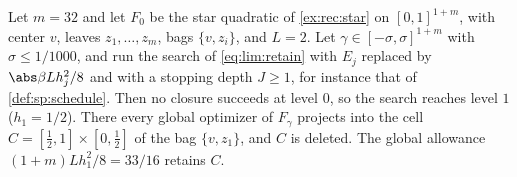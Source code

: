 \begin{proposition}\label{prop:lim:local}
Let $m=32$ and let $F_0$ be the star quadratic of \cref{ex:rec:star} on
$[0,1]^{1+m}$, with center $v$, leaves $z_1,\ldots,z_m$, bags
$\{v,z_i\}$, and $L=2$. Let $\gamma\in[-\sigma,\sigma]^{1+m}$ with
$\sigma\le1/1000$, and run the search of \eqref{eq:lim:retain} with $E_j$
replaced by $\abs\beta Lh_j^2/8$ and with a stopping depth $J\ge1$, for
instance that of \cref{def:sp:schedule}. Then no closure succeeds at
level $0$, so the search reaches level $1$ ($h_1=1/2$). There every global
optimizer of $F_\gamma$ projects into the cell $C=[\frac12,1]\times[0,\frac12]$
of the bag $\{v,z_1\}$, and $C$ is deleted. The global allowance
$(1+m)Lh_1^2/8=33/16$ retains $C$.
\end{proposition}

